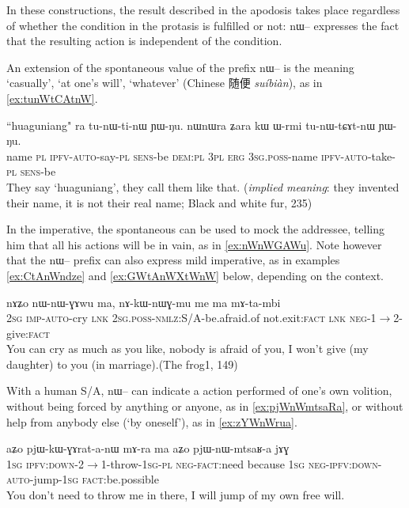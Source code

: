 \documentclass[oldfontcommands,oneside,a4paper,11pt]{article}
\newcommand{\ipa}[1]{{\phon \mbox{#1}}} %
\newcommand{\zh}[1]{{\cn #1}}
\begin{document}
In these constructions, the result described in the apodosis takes place regardless of whether the condition in the protasis is fulfilled or not: \ipa{nɯ--} expresses the fact that the resulting action is independent of the condition.

An extension of the spontaneous value of the prefix \ipa{nɯ--} is the meaning `casually', `at one's will', `whatever' (Chinese \zh{随便} \textit{suíbiàn}), as in \ref{ex:tunWtCAtnW}. 

\begin{exe}
\ex \label{ex:tunWtCAtnW}
\gll
``huaguniang" \ipa{ra}  	\ipa{tu-nɯ-ti-nɯ}  	\ipa{ɲɯ-ŋu.}  	\ipa{nɯnɯra}  	\ipa{ʑara}  	\ipa{kɯ}  	\ipa{ɯ-rmi}  	\ipa{tu-nɯ-tɕɤt-nɯ}  	\ipa{ɲɯ-ŋu.}  \\
name \textsc{pl}	\textsc{ipfv-auto}-say-\textsc{pl}	\textsc{sens}-be	\textsc{dem:pl}	\textsc{3pl}	\textsc{erg}	\textsc{3sg.poss}-name	\textsc{ipfv-auto}-take-\textsc{pl}	\textsc{sens}-be\\
\glt They say `huaguniang', they call them like that. (\textit{implied meaning}: they invented their name, it is not their real name; Black and white fur, 235)
\end{exe}

In the imperative, the spontaneous can be used to mock the addressee, telling him that all his actions will be in vain, as in \ref{ex:nWnWGAWu}. Note however that the \ipa{nɯ--} prefix can also express mild imperative, as in examples \ref{ex:CtAnWndze} and \ref{ex:GWtAnWXtWnW} below, depending on the context.

\begin{exe}
\ex \label{ex:nWnWGAWu}
\gll 
\ipa{nɤʑo} 	\ipa{nɯ-nɯ-ɣɤwu} 	\ipa{ma,} 	\ipa{nɤ-kɯ-nɯɣ-mu} 	\ipa{me} 	\ipa{ma} 	\ipa{mɤ-ta-mbi} \\
\textsc{2sg} \textsc{imp-auto}-cry \textsc{lnk} \textsc{2sg.poss-nmlz}:S/A-be.afraid.of not.exit:\textsc{fact} \textsc{lnk} \textsc{neg}-1$\rightarrow$2-give:\textsc{fact} \\
\glt You can cry as much as you like, nobody is afraid of you, I won't give (my daughter) to you (in marriage).(The frog1, 149)
\end{exe}

With a human S/A, \ipa{nɯ--} can indicate a action performed of one's own volition, without being forced by anything or anyone, as in \ref{ex:pjWnWmtsaRa}, or without help from anybody else (`by oneself'), as in \ref{ex:zYWnWrua}.

\begin{exe}
\ex \label{ex:pjWnWmtsaRa}
\gll 
\ipa{aʑo} 	\ipa{pjɯ-kɯ-ɣɤrat-a-nɯ} 	\ipa{mɤ-ra} 	\ipa{ma} 	\ipa{aʑo} 	\ipa{pjɯ-nɯ-mtsaʁ-a} 	\ipa{jɤɣ} \\
\textsc{1sg} \textsc{ipfv:down}-2$\rightarrow$1-throw-\textsc{1sg-pl} \textsc{neg-fact}:need because \textsc{1sg} \textsc{neg-ipfv:down-auto}-jump-\textsc{1sg} \textsc{fact}:be.possible \\
\glt You don't need to throw me in there, I will jump of my own free will.
\end{exe}
\end{document}
